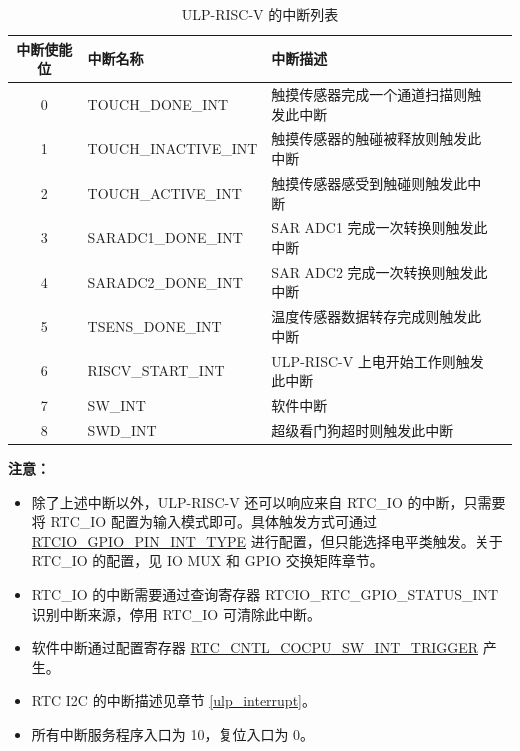 \documentclass[main\_\_CN.tex]{subfiles}
\begin{document}
\begin{table}[!ht]
    \centering
    \begin{tabular}{ c l l l }
    \textbf{中断使能位} & \textbf{中断名称} & \textbf{中断描述} \\ \hline
    0 & \label{interrupt:SENSCOCPUTOUCHDONEINT}TOUCH\_DONE\_INT & 触摸传感器完成一个通道扫描则触发此中断 \\
    1 & \label{interrupt:SENSCOCPUTOUCHINACTIVEINT}TOUCH\_INACTIVE\_INT & 触摸传感器的触碰被释放则触发此中断 \\
    2 & \label{interrupt:SENSCOCPUTOUCHACTIVEINT}TOUCH\_ACTIVE\_INT & 触摸传感器感受到触碰则触发此中断 \\
    3 & \label{interrupt:SENSCOCPUSARADC1DONEINT}SARADC1\_DONE\_INT & SAR ADC1 完成一次转换则触发此中断 \\
    4 & \label{interrupt:SENSCOCPUSARADC2DONEINT}SARADC2\_DONE\_INT & SAR ADC2 完成一次转换则触发此中断 \\
    5 & \label{interrupt:SENSCOCPUTSENSINT}TSENS\_DONE\_INT & 温度传感器数据转存完成则触发此中断 \\
    6 & \label{interrupt:SENSCOCPUSTARTINT}RISCV\_START\_INT & ULP-RISC-V 上电开始工作则触发此中断 \\
    7 & \label{interrupt:SENSCOCPUSWINT}SW\_INT & 软件中断 \\
    8 & \label{interrupt:SENSCOCPUSWDINT}SWD\_INT & 超级看门狗超时则触发此中断 \\
    \end{tabular}
    \caption{ULP-RISC-V 的中断列表}
    \label{table:PicoRV32 interrupt list}
\end{table}

\textbf{注意：}
\begin{itemize}
    \item 除了上述中断以外，ULP-RISC-V 还可以响应来自 RTC\_IO 的中断，只需要将 RTC\_IO 配置为输入模式即可。具体触发方式可通过 \hyperref[fielddesc:RTCIOGPIOPINNINTTYPE]{RTCIO\_GPIO\_PIN\_INT\_TYPE} 进行配置，但只能选择电平类触发。关于 RTC\_IO 的配置，见 IO MUX 和 GPIO 交换矩阵章节。
    \item RTC\_IO 的中断需要通过查询寄存器 RTCIO\_RTC\_GPIO\_STATUS\_INT 识别中断来源，停用 RTC\_IO 可清除此中断。
    \item 软件中断通过配置寄存器 \hyperref[fielddesc:RTCCNTLCOCPUSWINTTRIGGER]{RTC\_CNTL\_COCPU\_SW\_INT\_TRIGGER} 产生。
    \item RTC I2C 的中断描述见章节 \ref{ulp_interrupt}。
    \item 所有中断服务程序入口为 \hexprefix{}10，复位入口为 \hexprefix{}0。
\end{itemize}
\end{document}
